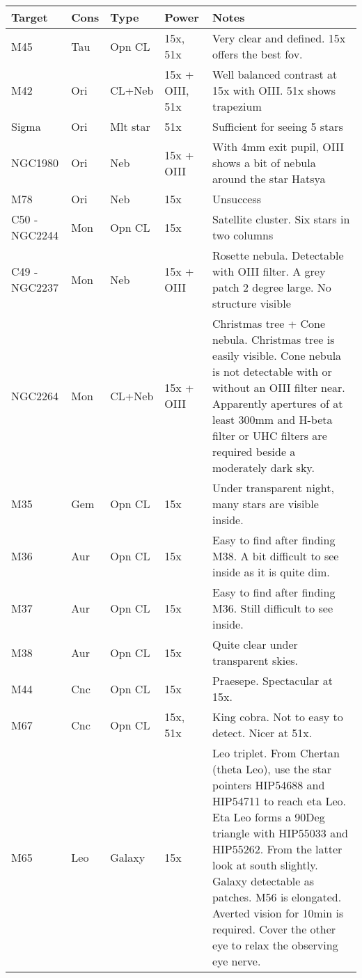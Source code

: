 \begin{longtable}{ p{0.7in}  p{0.3in}  p{0.6in}  p{0.9in}  p{5.8in} }
\hline 
{\bf Target} & {\bf Cons} & {\bf Type} & {\bf Power} & {\bf Notes} \\ 
\hline 
M45 & Tau & Opn CL & 15x, 51x & Very clear and defined. 15x offers the best fov. \\ 
M42 & Ori & CL+Neb & 15x + OIII, 51x & Well balanced contrast at 15x with OIII. 51x shows trapezium \\ 
Sigma & Ori & Mlt star & 51x & Sufficient for seeing 5 stars \\ 
NGC1980 & Ori & Neb & 15x + OIII & With 4mm exit pupil, OIII shows a bit of nebula around the star Hatsya \\ 
M78 & Ori & Neb & 15x & Unsuccess \\ 
C50 - NGC2244 & Mon & Opn CL & 15x & Satellite cluster. Six stars in two columns  \\ 
C49 - NGC2237 & Mon & Neb & 15x + OIII & Rosette nebula. Detectable with OIII filter. A grey patch 2 degree large. No structure visible \\ 
NGC2264 & Mon & CL+Neb & 15x + OIII & Christmas tree + Cone nebula. Christmas tree is easily visible. Cone nebula is not detectable with or without an OIII filter near. Apparently apertures of at least 300mm and H-beta filter or UHC filters are required beside a moderately dark sky. \\ 
M35 & Gem & Opn CL & 15x & Under transparent night, many stars are visible inside. \\ 
M36 & Aur & Opn CL & 15x & Easy to find after finding M38. A bit difficult to see inside as it is quite dim. \\ 
M37 & Aur & Opn CL & 15x & Easy to find after finding M36. Still difficult to see inside. \\ 
M38 & Aur & Opn CL & 15x & Quite clear under transparent skies. \\ 
M44 & Cnc & Opn CL & 15x & Praesepe. Spectacular at 15x. \\ 
M67 & Cnc & Opn CL & 15x, 51x & King cobra. Not to easy to detect. Nicer at 51x. \\ 
M65 & Leo & Galaxy & 15x & Leo triplet. From Chertan (theta Leo), use the star pointers HIP54688 and HIP54711 to reach eta Leo. Eta Leo forms a 90Deg triangle with HIP55033 and HIP55262. From the latter look at south slightly. Galaxy detectable as patches. M56 is elongated. Averted vision for 10min is required. Cover the other eye to relax the observing eye nerve. \\ 

\end{longtable}
